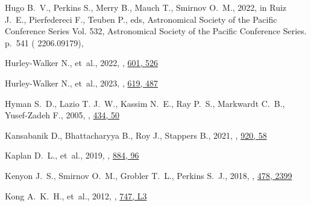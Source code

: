 \documentclass[fleqn,usenatbib]{mnras}
\begin{document}
\begin{thebibliography}{99}
{Hugo} B.~V.,  {Perkins} S.,  {Merry} B.,  {Mauch} T.,   {Smirnov} O.~M.,  2022, in {Ruiz} J.~E.,  {Pierfedereci} F.,   {Teuben} P.,  eds,  Astronomical Society of the Pacific Conference Series Vol. 532, Astronomical Society of the Pacific Conference Series. p.~541 ( {2206.09179}), 

{Hurley-Walker} N.,  et~al., 2022, , \href {https://ui.adsabs.harvard.edu/abs/2022Natur.601..526H} {601, 526}

{Hurley-Walker} N.,  et~al., 2023, , \href {https://ui.adsabs.harvard.edu/abs/2023Natur.619..487H} {619, 487}

{Hyman} S.~D.,  {Lazio} T. J.~W.,  {Kassim} N.~E.,  {Ray} P.~S.,  {Markwardt} C.~B.,   {Yusef-Zadeh} F.,  2005, , \href {https://ui.adsabs.harvard.edu/abs/2005Natur.434...50H} {434, 50}

{Kansabanik} D.,  {Bhattacharyya} B.,  {Roy} J.,   {Stappers} B.,  2021, , \href {https://ui.adsabs.harvard.edu/abs/2021ApJ...920...58K} {920, 58}

{Kaplan} D.~L.,  et~al., 2019, , \href {https://ui.adsabs.harvard.edu/abs/2019ApJ...884...96K} {884, 96}

{Kenyon} J.~S.,  {Smirnov} O.~M.,  {Grobler} T.~L.,   {Perkins} S.~J.,  2018, , \href {https://ui.adsabs.harvard.edu/abs/2018MNRAS.478.2399K} {478, 2399}

{Kong} A.~K.~H.,  et~al., 2012, , \href {https://ui.adsabs.harvard.edu/abs/2012ApJ...747L...3K} {747, L3}


\end{thebibliography}
\end{document}
